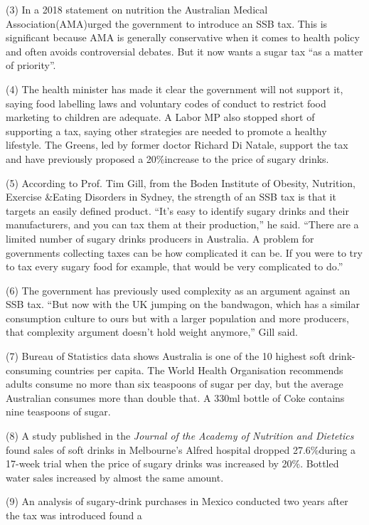 \documentclass[UTF8,11pt]{ctexart}
\begin{document}
(3) In a 2018 statement on nutrition the Australian Medical Association(AMA)urged the government to introduce an SSB tax. This is significant because AMA is generally conservative when it comes to health policy and often avoids controversial debates. But it now wants a sugar tax “as a matter of priority”.


(4) The health minister has made it clear the government will not support it, saying food labelling laws and voluntary codes of conduct to restrict food marketing to children are adequate. A Labor MP also stopped short of supporting a tax, saying other strategies are needed to promote a healthy lifestyle. The Greens, led by former doctor Richard Di Natale, support the tax and have previously proposed a 20\%increase to the price of sugary drinks.


(5) According to Prof. Tim Gill, from the Boden Institute of Obesity, Nutrition, Exercise \&Eating Disorders in Sydney, the strength of an SSB tax is that it targets an easily defined product. “It’s easy to identify sugary drinks and their manufacturers, and you can tax them at their production,” he said. “There are a limited number of sugary drinks producers in Australia. A problem for governments collecting taxes can be how complicated it can be. If you were to try to tax every sugary food for example, that would be very complicated to do.”


(6) The government has previously used complexity as an argument against an SSB tax. “But now with the UK jumping on the bandwagon, which has a similar consumption culture to ours but with a larger population and more producers, that complexity argument doesn’t hold weight anymore,” Gill said.


(7) Bureau of Statistics data shows Australia is one of the 10 highest soft drink-consuming countries per capita. The World Health Organisation recommends adults consume no more than six teaspoons of sugar per day, but the average Australian consumes more than double that. A 330ml bottle of Coke contains nine teaspoons of sugar.


(8) A study published in the \textit{Journal of the Academy of Nutrition and Dietetics} found sales of soft drinks in Melbourne’s Alfred hospital dropped 27.6\%during a 17-week trial when the price of sugary drinks was increased by 20\%. Bottled water sales increased by almost the same amount.


(9) An analysis of sugary-drink purchases in Mexico conducted two years after the tax was introduced found a
\end{document}
